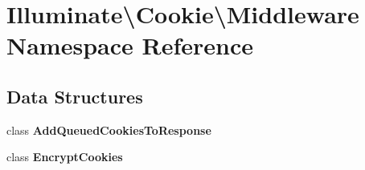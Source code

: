 \section{Illuminate\textbackslash{}Cookie\textbackslash{}Middleware Namespace Reference}
\label{namespace_illuminate_1_1_cookie_1_1_middleware}
\subsection*{Data Structures}
\begin{DoxyCompactItemize}
\item 
class {\bf Add\+Queued\+Cookies\+To\+Response}
\item 
class {\bf Encrypt\+Cookies}
\end{DoxyCompactItemize}
